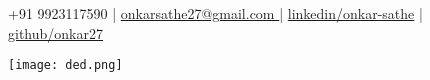 \documentclass[]{hieudo-build}
\begin{document}
%
%

{ +91 9923117590  |  \href{mailto:onkarsathe27@gmail.com}{onkarsathe27@gmail.com }  |  \href{https://www.linkedin.com/in/onkar-sathe/}{linkedin/onkar-sathe}  |  \href{https://github.com/onkar27}{github/onkar27 }}

\begin{minipage}{0.3\textwidth}
\texttt{[image: ded.png]}
\end{minipage}
\begin{minipage}{0.6\textwidth}
\end{minipage}
\noindent
\\

%
%

\begin{minipage}{0.3\textwidth}
\end{minipage}
%
%
\end{document}
